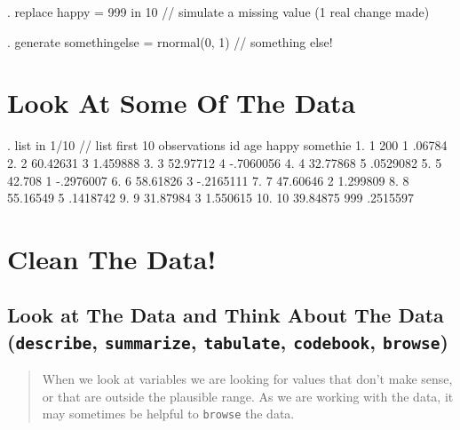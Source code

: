 \documentclass[
]{article}
\begin{document}
\begin{stlog}
. replace happy = 999 in 10 // simulate a missing value
(1 real change made)
\end{stlog}

\begin{stlog}
. generate somethingelse = rnormal(0, 1) // something else!
\end{stlog}

\section{Look At Some Of The Data}\label{look-at-some-of-the-data}

\begin{stlog}
. list in 1/10 // list first 10 observations
{\smallskip}
     {\TLC}
     {\VBAR} id        age   happy   somethi{\tytilde}e {\VBAR}
     {\LFTT}
  1. {\VBAR}  1        200       1      .06784 {\VBAR}
  2. {\VBAR}  2   60.42631       3    1.459888 {\VBAR}
  3. {\VBAR}  3   52.97712       4   -.7060056 {\VBAR}
  4. {\VBAR}  4   32.77868       5    .0529082 {\VBAR}
  5. {\VBAR}  5     42.708       1   -.2976007 {\VBAR}
     {\LFTT}
  6. {\VBAR}  6   58.61826       3   -.2165111 {\VBAR}
  7. {\VBAR}  7   47.60646       2    1.299809 {\VBAR}
  8. {\VBAR}  8   55.16549       5    .1418742 {\VBAR}
  9. {\VBAR}  9   31.87984       3    1.550615 {\VBAR}
 10. {\VBAR} 10   39.84875     999    .2515597 {\VBAR}
     {\BLC}
\end{stlog}

\section{Clean The Data!}\label{clean-the-data}

\subsection{\texorpdfstring{Look at The Data and Think About The Data
(\texttt{describe}, \texttt{summarize}, \texttt{tabulate},
\texttt{codebook},
\texttt{browse})}{Look at The Data and Think About The Data (describe, summarize, tabulate, codebook, browse)}}\label{look-at-the-data-and-think-about-the-data-describe-summarize-tabulate-codebook-browse}

\begin{quote}
When we look at variables we are looking for values that don't make
sense, or that are outside the plausible range. As we are working with
the data, it may sometimes be helpful to \texttt{browse} the data.
\end{quote}
\end{document}
